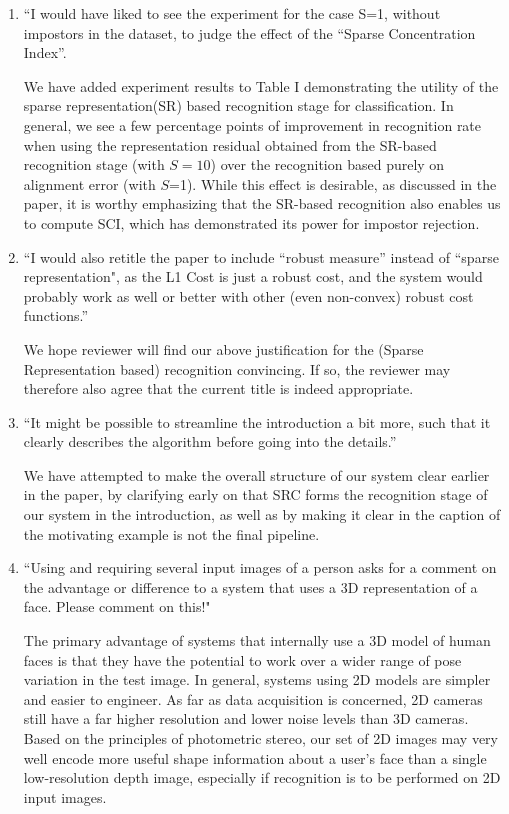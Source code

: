 \documentclass[11pt]{article}
\begin{document}
\begin{enumerate}
\item ``I would have liked to see the experiment for the case S=1, without
impostors in the dataset, to judge the effect of the ``Sparse
Concentration Index''.

We have added experiment results to Table I demonstrating the utility of the
sparse representation(SR) based recognition stage for classification.  In
general, we see a few percentage points of improvement in recognition rate when
using the representation residual obtained from the SR-based recognition stage
(with $S=10$) over the recognition based purely on alignment error (with
$S$=1).  While this effect is desirable, as discussed in the paper, it is
worthy emphasizing that the SR-based recognition also enables us to compute
SCI, which has demonstrated its power for impostor rejection.

\item ``I would also retitle the paper to include ``robust measure''
instead of ``sparse representation", as the L1 Cost is just a robust
cost, and the system would probably work as well or better with other
(even non-convex) robust cost functions.''

We hope reviewer will find our above justification for the (Sparse
Representation based) recognition convincing.  If so, the reviewer may
therefore also agree that the current title is indeed appropriate.

\item ``It might be possible to streamline the introduction a bit more, such that it
clearly describes the algorithm before going into the details.''

We have attempted to make the overall structure of our system clear earlier in the
paper, by clarifying early on that SRC forms the recognition stage of our system
in the introduction, as well as by making it clear in the caption of the motivating example
is not the final pipeline.

\item ``Using and requiring several input images of a person asks for a
comment on the advantage or difference to a system that uses
a 3D representation of a face. Please comment on this!"

The primary advantage of systems that internally use a 3D model of human faces
is that they have the potential to work over a wider range of pose variation in
the test image.  In general, systems using 2D models are simpler and easier to
engineer.  As far as data acquisition is concerned, 2D cameras still have a far
higher resolution and lower noise levels than 3D cameras.  Based on the principles
of photometric stereo, our set of 2D images may very well encode more useful shape
information about a user's face than a single low-resolution depth image, especially if
recognition is to be performed on 2D input images.


\end{enumerate}
\end{document}
